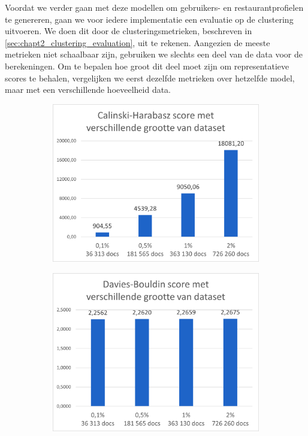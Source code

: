 Voordat we verder gaan met deze modellen om gebruikers- en restaurantprofielen te genereren, gaan we voor iedere implementatie een evaluatie op de clustering uitvoeren. We doen dit door de clusteringsmetrieken, beschreven in \autoref{sec:chapt2_clustering_evaluation}, uit te rekenen. Aangezien de meeste metrieken niet schaalbaar zijn, gebruiken we slechts een deel van de data voor de berekeningen. Om te bepalen hoe groot dit deel moet zijn om representatieve scores te behalen, vergelijken we eerst dezelfde metrieken over hetzelfde model, maar met een verschillende hoeveelheid data.

\begin{figure}[H]
    \begin{subfigure}{.5\textwidth}
        \centering
        \includegraphics[width=1\linewidth]{fig/chapt4/NLP/cal_data.png}
    \end{subfigure}
    \begin{subfigure}{.5\textwidth}
        \centering
        \includegraphics[width=1\linewidth]{fig/chapt4/NLP/davies_data.png}
    \end{subfigure}
    

\end{figure}
